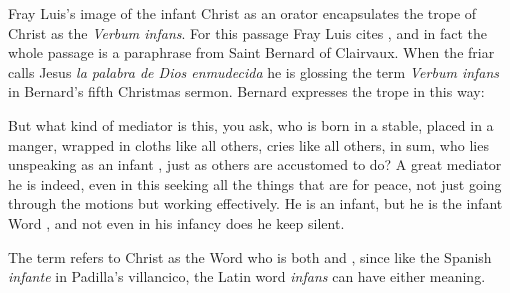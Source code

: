 Fray Luis's image of the infant Christ as an orator encapsulates the trope of
Christ as the \emph{Verbum infans}.
For this passage Fray Luis cites , and in fact the whole
passage is a paraphrase from Saint Bernard of Clairvaux.
When the friar calls Jesus \emph{la palabra de Dios enmudecida} he is glossing
the term \emph{Verbum infans} in Bernard's fifth Christmas sermon.
Bernard expresses the trope in this way:
\begin{quoting}
    But what kind of mediator is this, you ask, who is born in a stable, placed
    in a manger, wrapped in cloths like all others, cries like all others, in
    sum, who lies unspeaking as an infant , just as others
    are accustomed to do?
    A great mediator he is indeed, even in this seeking all the things that are
    for peace, not just going through the motions but working effectively.  He
    is an infant, but he is the infant Word , and not
    even in his infancy does he keep silent.%
        \Autocite
        [128A, Sermo V: .]
        {Bernard:Nativitate}
\end{quoting}
The term refers to Christ as the Word who is both  and
, since like the Spanish \emph{infante} in Padilla's
villancico, the Latin word \emph{infans} can have either meaning.

